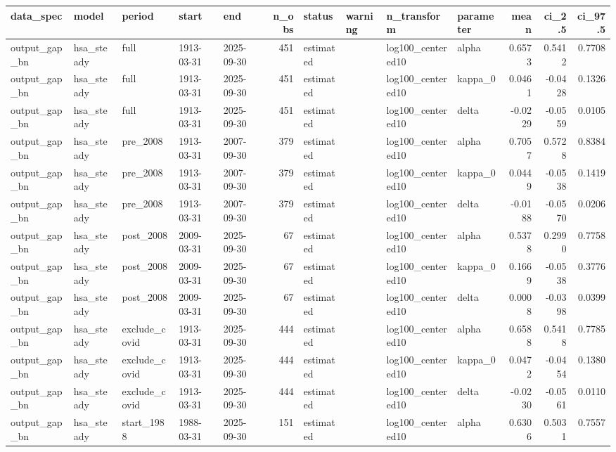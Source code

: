\begin{tabular}{lllllrllllrrr}
\toprule
data\_spec & model & period & start & end & n\_obs & status & warning & n\_transform & parameter & mean & ci\_2.5 & ci\_97.5 \\
\midrule
output\_gap\_bn & hsa\_steady & full & 1913-03-31 & 2025-09-30 & 451 & estimated &  & log100\_centered10 & alpha & 0.6573 & 0.5412 & 0.7708 \\
output\_gap\_bn & hsa\_steady & full & 1913-03-31 & 2025-09-30 & 451 & estimated &  & log100\_centered10 & kappa\_0 & 0.0461 & -0.0428 & 0.1326 \\
output\_gap\_bn & hsa\_steady & full & 1913-03-31 & 2025-09-30 & 451 & estimated &  & log100\_centered10 & delta & -0.0229 & -0.0559 & 0.0105 \\
output\_gap\_bn & hsa\_steady & pre\_2008 & 1913-03-31 & 2007-09-30 & 379 & estimated &  & log100\_centered10 & alpha & 0.7057 & 0.5728 & 0.8384 \\
output\_gap\_bn & hsa\_steady & pre\_2008 & 1913-03-31 & 2007-09-30 & 379 & estimated &  & log100\_centered10 & kappa\_0 & 0.0449 & -0.0538 & 0.1419 \\
output\_gap\_bn & hsa\_steady & pre\_2008 & 1913-03-31 & 2007-09-30 & 379 & estimated &  & log100\_centered10 & delta & -0.0188 & -0.0570 & 0.0206 \\
output\_gap\_bn & hsa\_steady & post\_2008 & 2009-03-31 & 2025-09-30 & 67 & estimated &  & log100\_centered10 & alpha & 0.5378 & 0.2990 & 0.7758 \\
output\_gap\_bn & hsa\_steady & post\_2008 & 2009-03-31 & 2025-09-30 & 67 & estimated &  & log100\_centered10 & kappa\_0 & 0.1669 & -0.0538 & 0.3776 \\
output\_gap\_bn & hsa\_steady & post\_2008 & 2009-03-31 & 2025-09-30 & 67 & estimated &  & log100\_centered10 & delta & 0.0008 & -0.0398 & 0.0399 \\
output\_gap\_bn & hsa\_steady & exclude\_covid & 1913-03-31 & 2025-09-30 & 444 & estimated &  & log100\_centered10 & alpha & 0.6588 & 0.5418 & 0.7785 \\
output\_gap\_bn & hsa\_steady & exclude\_covid & 1913-03-31 & 2025-09-30 & 444 & estimated &  & log100\_centered10 & kappa\_0 & 0.0472 & -0.0454 & 0.1380 \\
output\_gap\_bn & hsa\_steady & exclude\_covid & 1913-03-31 & 2025-09-30 & 444 & estimated &  & log100\_centered10 & delta & -0.0230 & -0.0561 & 0.0110 \\
output\_gap\_bn & hsa\_steady & start\_1988 & 1988-03-31 & 2025-09-30 & 151 & estimated &  & log100\_centered10 & alpha & 0.6306 & 0.5031 & 0.7557 \\

\end{tabular}
